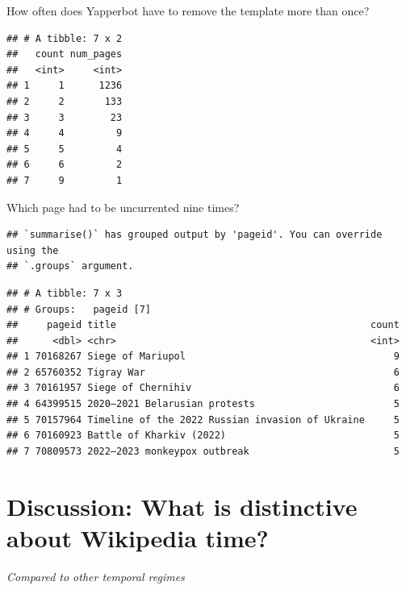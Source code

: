 \documentclass[Royal,times,sageh]{sagej}
\begin{document}
How often does Yapperbot have to remove the template more than once?

\begin{verbatim}
## # A tibble: 7 x 2
##   count num_pages
##   <int>     <int>
## 1     1      1236
## 2     2       133
## 3     3        23
## 4     4         9
## 5     5         4
## 6     6         2
## 7     9         1
\end{verbatim}

Which page had to be uncurrented nine times?

\begin{verbatim}
## `summarise()` has grouped output by 'pageid'. You can override using the
## `.groups` argument.
\end{verbatim}

\begin{verbatim}
## # A tibble: 7 x 3
## # Groups:   pageid [7]
##     pageid title                                            count
##      <dbl> <chr>                                            <int>
## 1 70168267 Siege of Mariupol                                    9
## 2 65760352 Tigray War                                           6
## 3 70161957 Siege of Chernihiv                                   6
## 4 64399515 2020–2021 Belarusian protests                        5
## 5 70157964 Timeline of the 2022 Russian invasion of Ukraine     5
## 6 70160923 Battle of Kharkiv (2022)                             5
## 7 70809573 2022–2023 monkeypox outbreak                         5
\end{verbatim}

\hypertarget{discussion-what-is-distinctive-about-wikipedia-time}{%
\section{Discussion: What is distinctive about Wikipedia
time?}\label{discussion-what-is-distinctive-about-wikipedia-time}}

\emph{Compared to other temporal regimes}



\end{document}
